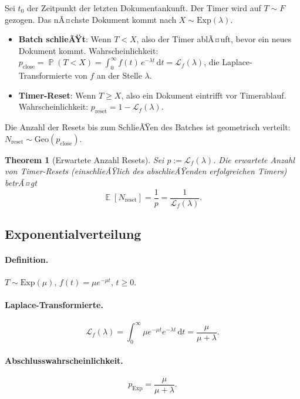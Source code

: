 ﻿\documentclass[12pt, a4paper]{article}
\newtheorem{theorem}{Theorem}[section]
\DeclareMathOperator{\E}{\mathbb{E}}
\DeclareMathOperator{\Prob}{\mathbb{P}}
\newcommand{\Geo}{\mathrm{Geo}}
\newcommand{\Exp}{\mathrm{Exp}}
\begin{document}
Sei $t_0$ der Zeitpunkt der letzten Dokumentankunft. Der Timer wird auf
$T \sim F$ gezogen. Das nÃ¤chste Dokument kommt nach $X \sim \Exp(\lambda)$.

\begin{itemize}[noitemsep]
  \item \textbf{Batch schlieÃŸt}: Wenn $T < X$, also der Timer ablÃ¤uft, bevor
        ein neues Dokument kommt. Wahrscheinlichkeit:
        $p_{\mathrm{close}} = \Prob(T < X) = \int_0^\infty f(t)\,e^{-\lambda t}\,\mathrm{d}t
        = \mathcal{L}_f(\lambda)$, die Laplace-Transformierte von $f$ an der
        Stelle $\lambda$.
  \item \textbf{Timer-Reset}: Wenn $T \geq X$, also ein Dokument eintrifft
        vor Timerablauf. Wahrscheinlichkeit: $p_{\mathrm{reset}} = 1 - \mathcal{L}_f(\lambda)$.
\end{itemize}

Die Anzahl der Resets bis zum SchlieÃŸen des Batches ist geometrisch verteilt:
$N_{\mathrm{reset}} \sim \Geo(p_{\mathrm{close}})$.

\begin{theorem}[Erwartete Anzahl Resets]\label{thm:resets}
Sei $p := \mathcal{L}_f(\lambda)$. Die erwartete Anzahl von Timer-Resets
(einschlieÃŸlich des abschlieÃŸenden erfolgreichen Timers) betrÃ¤gt
\[
  \E[N_{\mathrm{reset}}] = \frac{1}{p} = \frac{1}{\mathcal{L}_f(\lambda)}.
\]
\end{theorem}

\subsection{Exponentialverteilung}\label{subsec:exp}

\paragraph{Definition.}
$T \sim \Exp(\mu)$, $f(t) = \mu e^{-\mu t}$, $t \geq 0$.

\paragraph{Laplace-Transformierte.}
\[
  \mathcal{L}_f(\lambda) = \int_0^\infty \mu e^{-\mu t} e^{-\lambda t}\,\mathrm{d}t
  = \frac{\mu}{\mu + \lambda}.
\]

\paragraph{Abschlusswahrscheinlichkeit.}
\[
  p_{\Exp} = \frac{\mu}{\mu + \lambda}.
\]
\end{document}
